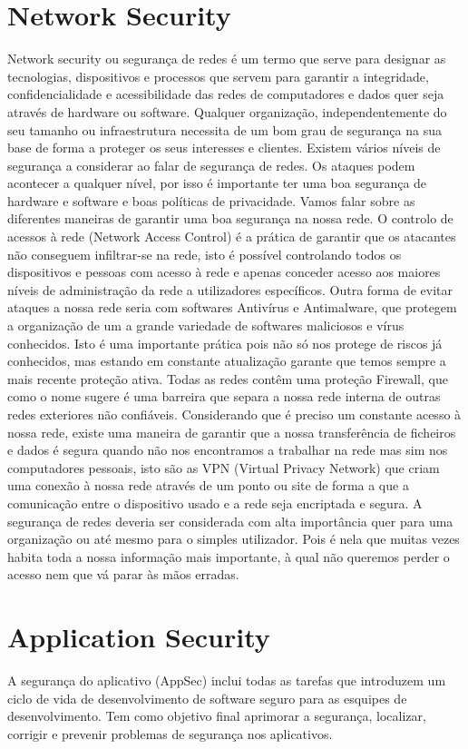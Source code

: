\documentclass{report}
\begin{document}
\section{Network Security}
\cite{forcepoint}
\normalsize{Network security ou segurança de redes é um termo que serve para designar as tecnologias, dispositivos e processos que servem para garantir a integridade, confidencialidade e acessibilidade das redes de computadores e dados quer seja através de hardware ou software. Qualquer organização, independentemente do seu tamanho ou infraestrutura necessita de um bom grau de segurança na sua base de forma a proteger os seus interesses e clientes.
Existem vários níveis de segurança a considerar ao falar de segurança de redes. Os ataques podem acontecer a qualquer nível, por isso é importante ter uma boa segurança de hardware e software e boas políticas de privacidade.
Vamos falar sobre as diferentes maneiras de garantir uma boa segurança na nossa rede.
O controlo de acessos à rede (Network Access Control) é a prática de garantir que os atacantes não conseguem infiltrar-se na rede, isto é possível controlando todos os dispositivos e pessoas com acesso à rede e apenas conceder acesso aos maiores níveis de administração da rede a utilizadores específicos.
Outra forma de evitar ataques a nossa rede seria com softwares Antivírus e Antimalware, que protegem a organização de um a grande variedade de softwares maliciosos e vírus conhecidos. Isto é uma importante prática pois não só nos protege de riscos já conhecidos, mas estando em constante atualização garante que temos sempre a mais recente proteção ativa.
Todas as redes contêm uma proteção Firewall, que como o nome sugere é uma barreira que separa a nossa rede interna de outras redes exteriores não confiáveis.
Considerando que é preciso um constante acesso à nossa rede, existe uma maneira de garantir que a nossa transferência de ficheiros e dados é segura quando não nos encontramos a trabalhar na rede mas sim nos computadores pessoais, isto são as \ac{VPN} (Virtual Privacy Network) que criam uma conexão à nossa rede através de um ponto ou site de forma a que a comunicação entre o dispositivo usado e a rede seja encriptada e segura.
A segurança de redes deveria ser considerada com alta importância quer para uma organização ou até mesmo para o simples utilizador. Pois é nela que muitas vezes habita toda a nossa informação mais importante, à qual não queremos perder o acesso nem que vá parar às mãos erradas.}
\clearpage

\section{Application Security}
\cite{wiki2}
\cite{vmware}
A segurança do aplicativo (AppSec) inclui todas as tarefas que introduzem um ciclo de vida de desenvolvimento de software seguro para as esquipes de desenvolvimento. Tem como objetivo final aprimorar a segurança, localizar, corrigir e prevenir problemas de segurança nos aplicativos. 
\end{document}
